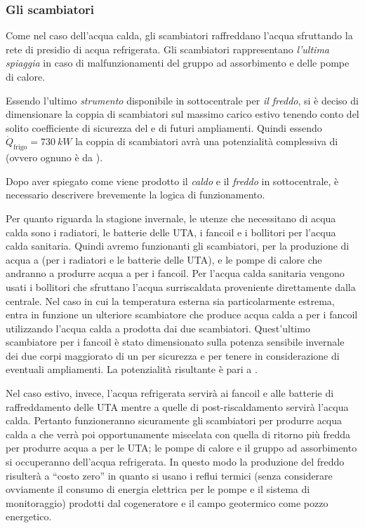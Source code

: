 \subsubsection{Gli scambiatori}
Come nel caso dell'acqua calda, gli scambiatori raffreddano l'acqua sfruttando la rete di presidio di acqua refrigerata. Gli scambiatori rappresentano \emph{l'ultima spiaggia} in caso di malfunzionamenti del gruppo ad assorbimento e delle pompe di calore.

Essendo l'ultimo \emph{strumento} disponibile in sottocentrale per \emph{il freddo}, si è deciso di dimensionare la coppia di scambiatori sul massimo carico estivo tenendo conto del solito coefficiente di sicurezza del  e di futuri ampliamenti. Quindi essendo $\dot{Q}_{\mathrm{frigo}}= \SI{730}{kW}$ la coppia di scambiatori avrà una potenzialità complessiva di  (ovvero ognuno è da ).

\vspace{1em}

Dopo aver spiegato come viene prodotto il \emph{caldo} e il \emph{freddo} in sottocentrale, è necessario descrivere brevemente la logica di funzionamento.

Per quanto riguarda la stagione invernale, le utenze che necessitano di acqua calda sono i radiatori, le batterie delle UTA, i fancoil e i bollitori per l'acqua calda sanitaria. Quindi avremo funzionanti gli scambiatori, per la produzione di acqua a  (per i radiatori e le batterie delle UTA), e le pompe di calore che andranno a produrre acqua a  per i fancoil. Per l'acqua calda sanitaria vengono usati i bollitori che sfruttano l'acqua surriscaldata proveniente direttamente dalla centrale. Nel caso in cui la temperatura esterna sia particolarmente estrema, entra in funzione un ulteriore scambiatore che produce acqua calda a  per i fancoil utilizzando l'acqua calda a  prodotta dai due scambiatori. Quest'ultimo scambiatore per i fancoil è stato dimensionato sulla potenza sensibile invernale dei due corpi maggiorato di un  per sicurezza e per tenere in considerazione di eventuali ampliamenti. La potenzialità risultante è pari a . 

Nel caso estivo, invece, l'acqua refrigerata servirà ai fancoil e alle batterie di raffreddamento delle UTA mentre a quelle di post-riscaldamento servirà l'acqua calda. Pertanto funzioneranno sicuramente gli scambiatori per produrre acqua calda a  che verrà poi opportunamente miscelata con quella di ritorno più fredda per produrre acqua a  per le UTA; le pompe di calore e il gruppo ad assorbimento si occuperanno dell'acqua refrigerata. In questo modo la produzione del freddo risulterà a ``costo zero'' in quanto si usano i reflui termici (senza considerare ovviamente il consumo di energia elettrica per le pompe e il sistema di monitoraggio) prodotti dal cogeneratore e il campo geotermico come pozzo energetico.

